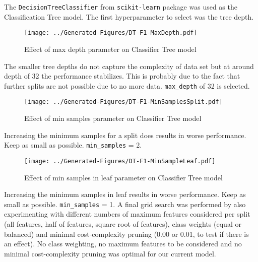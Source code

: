 \documentclass[conference]{IEEEtran}
\begin{document}
The \texttt{DecisionTreeClassifier} from \texttt{scikit-learn} package was used as the Classification Tree model. The first hyperparameter to select was the tree depth.

\begin{figure}[H]
	\centering
	\begin{minipage}{0.45\textwidth}
		\centering
		\texttt{[image: ../Generated-Figures/DT-F1-MaxDepth.pdf]}
		\caption{Effect of max depth parameter on Classifier Tree model}
		\label{fig:maxdepth}
	\end{minipage}
\end{figure}

The smaller tree depths do not capture the complexity of data set but at around depth of 32 the performance stabilizes. This is probably due to the fact that further splits are not possible due to no more data. \texttt{max\_depth} of 32 is selected.

\begin{figure}[H]
	\centering
	\begin{minipage}{0.45\textwidth}
		\centering
		\texttt{[image: ../Generated-Figures/DT-F1-MinSamplesSplit.pdf]}
		\caption{Effect of min samples parameter on Classifier Tree model}
		\label{fig:samplesplit}
	\end{minipage}
\end{figure}

Increasing the minimum samples for a split does results in worse performance. Keep as small as possible. \texttt{min\_samples} = 2.

\begin{figure}[H]
	\centering
	\begin{minipage}{0.45\textwidth}
		\centering
		\texttt{[image: ../Generated-Figures/DT-F1-MinSampleLeaf.pdf]}
		\caption{Effect of min samples in leaf parameter on Classifier Tree model}
		\label{fig:sampleleaf}
	\end{minipage}
\end{figure}

Increasing the minimum samples in leaf results in worse performance. Keep as small as possible. \texttt{min\_samples} = 1. A final grid search was performed by also experimenting with different numbers of maximum features considered per split (all features, half of features, square root of features), class weights (equal or balanced) and minimal cost-complexity pruning (0.00 or 0.01, to test if there is an effect). No class weighting, no maximum features to be considered and no minimal cost-complexity pruning was optimal for our current model.
\end{document}
